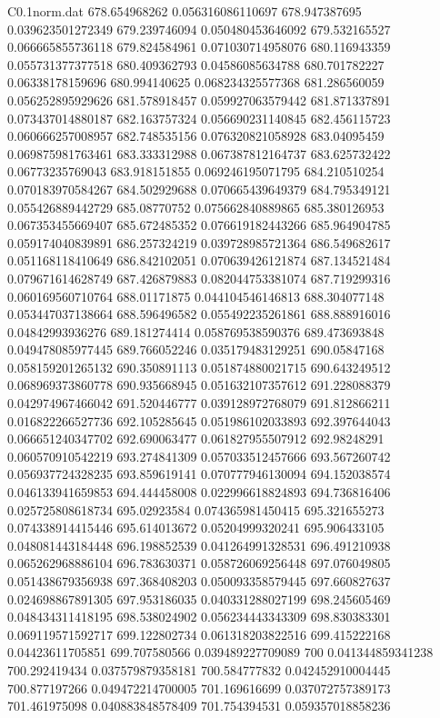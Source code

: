 \begin{filecontents}{C0.1norm.dat}
678.654968262		0.056316086110697
678.947387695		0.039623501272349
679.239746094		0.050480453646092
679.532165527		0.066665855736118
679.824584961		0.071030714958076
680.116943359		0.055731377377518
680.409362793		0.04586085634788
680.701782227		0.06338178159696
680.994140625		0.068234325577368
681.286560059		0.056252895929626
681.578918457		0.059927063579442
681.871337891		0.073437014880187
682.163757324		0.056690231140845
682.456115723		0.060666257008957
682.748535156		0.076320821058928
683.04095459		0.069875981763461
683.333312988		0.067387812164737
683.625732422		0.06773235769043
683.918151855		0.069246195071795
684.210510254		0.070183970584267
684.502929688		0.070665439649379
684.795349121		0.055426889442729
685.08770752		0.075662840889865
685.380126953		0.067353455669407
685.672485352		0.076619182443266
685.964904785		0.059174040839891
686.257324219		0.039728985721364
686.549682617		0.051168118410649
686.842102051		0.070639426121874
687.134521484		0.079671614628749
687.426879883		0.082044753381074
687.719299316		0.060169560710764
688.01171875		0.044104546146813
688.304077148		0.053447037138664
688.596496582		0.055492235261861
688.888916016		0.04842993936276
689.181274414		0.058769538590376
689.473693848		0.049478085977445
689.766052246		0.035179483129251
690.05847168		0.058159201265132
690.350891113		0.051874880021715
690.643249512		0.068969373860778
690.935668945		0.051632107357612
691.228088379		0.042974967466042
691.520446777		0.039128972768079
691.812866211		0.016822266527736
692.105285645		0.051986102033893
692.397644043		0.066651240347702
692.690063477		0.061827955507912
692.98248291		0.060570910542219
693.274841309		0.057033512457666
693.567260742		0.056937724328235
693.859619141		0.070777946130094
694.152038574		0.046133941659853
694.444458008		0.022996618824893
694.736816406		0.025725808618734
695.02923584		0.074365981450415
695.321655273		0.074338914415446
695.614013672		0.05204999320241
695.906433105		0.048081443184448
696.198852539		0.041264991328531
696.491210938		0.065262968886104
696.783630371		0.058726069256448
697.076049805		0.051438679356938
697.368408203		0.050093358579445
697.660827637		0.024698867891305
697.953186035		0.040331288027199
698.245605469		0.048434311418195
698.538024902		0.056234443343309
698.830383301		0.069119571592717
699.122802734		0.061318203822516
699.415222168		0.04423611705851
699.707580566		0.039489227709089
700		0.041344859341238
700.292419434		0.037579879358181
700.584777832		0.042452910004445
700.877197266		0.049472214700005
701.169616699		0.037072757389173
701.461975098		0.040883848578409
701.754394531		0.059357018858236

\end{filecontents}
